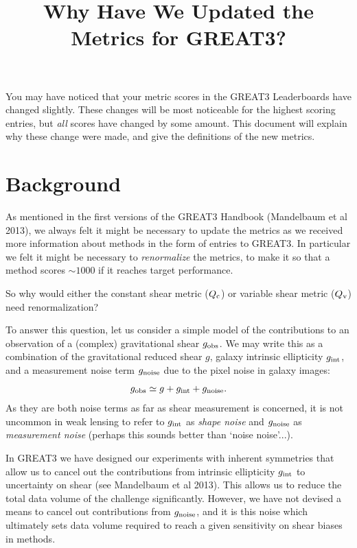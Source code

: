 \documentclass[preprint,11pt]{aastex}
\begin{document}
\setlength{\parskip}{2.0ex plus 0.5ex minus 0.5ex}
\setlength{\parindent}{0cm} 

\title{Why Have We Updated the Metrics for GREAT3?}

You may have noticed that your metric scores in the GREAT3
Leaderboards have changed slightly.  These changes will be most
noticeable for the highest scoring entries, but \emph{all} scores have
changed by some amount.  This document will explain why these change
were made, and give the definitions of the new metrics.

\section{Background}
As mentioned in the first versions of the GREAT3 Handbook (Mandelbaum
et al 2013), we always felt it
might be necessary to update the metrics as we received more
information about methods in the form of entries to GREAT3.  In
particular we felt it might be necessary to \emph{renormalize} the
metrics, to make it so that a method scores $\sim 1000$ if it reaches
target performance.

So why would either the constant shear metric ($Q_{\rm c}$) or
variable shear metric ($Q_{\rm v}$) need renormalization?

To answer this question, let us consider a simple model of the
contributions to an observation of a (complex) gravitational shear $g_{\rm obs}$.
We may write this as a combination of the gravitational reduced shear $g$, galaxy intrinsic ellipticity
$g_{\rm int}$, and a measurement noise term $g_{\rm noise}$ due to the
pixel noise in galaxy images:
\begin{equation}
g_{\rm obs} \simeq g + g_{\rm int} + g_{\rm noise}.
\end{equation}
As they are both noise terms as far as shear measurement is concerned,
it is not uncommon in weak lensing to refer to $g_{\rm int}$ as \emph{shape
  noise} and $g_{\rm noise}$ as \emph{measurement noise} (perhaps this sounds
better than `noise noise'...).

In GREAT3 we have designed our experiments with inherent symmetries
that allow us to cancel out the contributions from intrinsic ellipticity
$g_{\rm int}$ to uncertainty on shear (see Mandelbaum et al 2013).
This allows us to reduce the  total data volume of the challenge
significantly.  However, we have not devised a means to cancel out
contributions from $g_{\rm noise}$, and it is this noise which
ultimately sets data volume required to reach a given sensitivity on
shear biases in methods.
\end{document}
